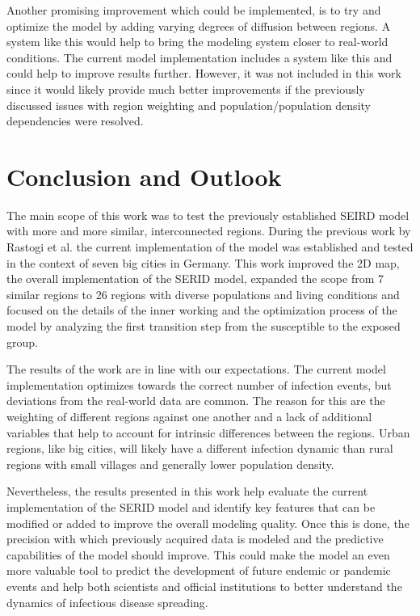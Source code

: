 Another promising improvement which could be implemented, is to try and optimize the model by adding varying degrees of
diffusion between regions. A system like this would help to bring the modeling system closer to real-world conditions. The current
model implementation includes a system like this and could help to improve results further. However, it was not included
in this work since it would likely provide much better improvements if the previously discussed issues with region weighting
and population/population density dependencies were resolved.


\section{Conclusion and Outlook}
The main scope of this work was to test the previously established SEIRD model with more and more similar, interconnected regions.
During the previous work by Rastogi et al.\cite{Rastogi} the current implementation of the model was established and tested in the
context of seven big cities in Germany. This work improved the 2D map, the overall implementation of the SERID model, expanded
the scope from 7 similar regions to 26 regions with diverse populations and living conditions and focused on the
details of the inner working and the optimization process of the model by analyzing the first transition step from the susceptible
to the exposed group.\newline

The results of the work are in line with our expectations. The current model implementation
optimizes towards the correct number of infection events, but deviations from the real-world data are common. The reason for
this are the weighting of different regions against one another and a lack of additional variables that help to account for
intrinsic differences between the regions. Urban regions, like big cities, will likely have a different infection dynamic
than rural regions with small villages and generally lower population density.\newline

Nevertheless, the results presented in this work help evaluate the current implementation of the SERID model and identify
key features that can be modified or added to improve the overall modeling quality. Once this is done, the precision with
which previously acquired data is modeled and the predictive capabilities of the model should improve. This could make
the model an even more valuable tool to predict the development of future endemic or pandemic events and help both scientists and official
institutions to better understand the dynamics of infectious disease spreading.




